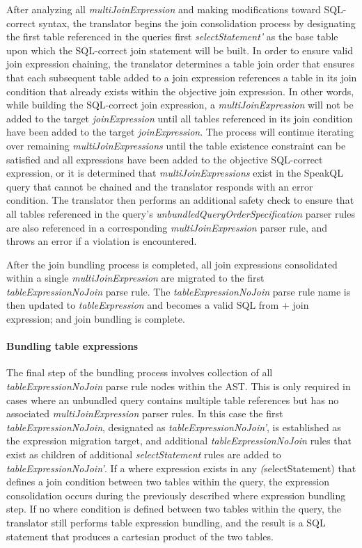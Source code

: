 After analyzing all \emph{multiJoinExpression} and making modifications toward SQL-correct syntax, the translator begins the join consolidation process by designating the first table referenced in the queries first \emph{selectStatement'} as the base table upon which the SQL-correct join statement will be built. In order to ensure valid join expression chaining, the translator determines a table join order that ensures that each subsequent table added to a join expression references a table in its join condition that already exists within the objective join expression. In other words, while building the SQL-correct join expression, a \emph{multiJoinExpression} will not be added to the target \emph{joinExpression} until all tables referenced in its join condition have been added to the target \emph{joinExpression}. The process will continue iterating over remaining \emph{multiJoinExpressions} until the table existence constraint can be satisfied and all expressions have been added to the objective SQL-correct expression, or it is determined that \emph{multiJoinExpressions} exist in the SpeakQL query that cannot be chained and the translator responds with an error condition. The translator then performs an additional safety check to ensure that all tables referenced in the query's \emph{unbundledQueryOrderSpecification} parser rules are also referenced in a corresponding \emph{multiJoinExpression} parser rule, and throws an error if a violation is encountered.

After the join bundling process is completed, all join expressions consolidated within a single \emph{multiJoinExpression} are migrated to the first \emph{tableExpressionNoJoin} parse rule. The \emph{tableExpressionNoJoin} parse rule name is then updated to \emph{tableExpression} and becomes a valid SQL from + join expression; and join bundling is complete.

\paragraph{Bundling table expressions}

The final step of the bundling process involves collection of all \emph{tableExpressionNoJoin} parse rule nodes within the AST. This is only required in cases where an unbundled query contains multiple table references but has no associated \emph{multiJoinExpression} parser rules. In this case the first \emph{tableExpressionNoJoin}, designated as \emph{tableExpressionNoJoin'}, is established as the expression migration target, and additional \emph{tableExpressionNoJoin} rules that exist as children of additional \emph{selectStatement} rules are added to \emph{tableExpressionNoJoin'}. If a where expression exists in any \emph(selectStatement) that defines a join condition between two tables within the query, the expression consolidation occurs during the previously described where expression bundling step. If no where condition is defined between two tables within the query, the translator still performs table expression bundling, and the result is a SQL statement that produces a cartesian product of the two tables.

